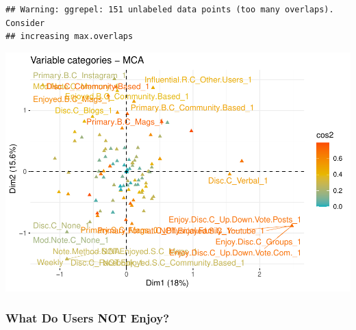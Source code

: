 \documentclass[
]{article}
\newenvironment{Shaded}{\begin{snugshade}}{\end{snugshade}}
\newcommand{\DataTypeTok}[1]{\textcolor[rgb]{0.13,0.29,0.53}{#1}}
\newcommand{\KeywordTok}[1]{\textcolor[rgb]{0.13,0.29,0.53}{\textbf{#1}}}
\newcommand{\NormalTok}[1]{#1}
\newcommand{\OtherTok}[1]{\textcolor[rgb]{0.56,0.35,0.01}{#1}}
\newcommand{\StringTok}[1]{\textcolor[rgb]{0.31,0.60,0.02}{#1}}
\begin{document}
\begin{Shaded}
\end{Shaded}

\begin{verbatim}
## Warning: ggrepel: 151 unlabeled data points (too many overlaps). Consider
## increasing max.overlaps
\end{verbatim}

\includegraphics{Average-User-MCA_files/figure-latex/diet no enjoy-3.pdf}

\hypertarget{what-do-users-not-enjoy-1}{%
\subsubsection{What Do Users NOT
Enjoy?}\label{what-do-users-not-enjoy-1}}
\end{document}
